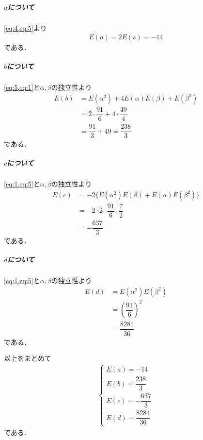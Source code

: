 \documentclass[../../main.tex]{subfiles}
\begin{document}
\subparagraph{$a$について}

\cref{eq:4,eq:5}より
\begin{align}
  E(a)=2E(s)=-14
\end{align}
である．

\subparagraph{$b$について}

\cref{eq:5,eq:1}と$\alpha,\beta$の独立性より
\begin{align}
  E(b)
  &=E(\alpha^2)+4E(\alpha)E(\beta)+E(\beta^2) \\
  &=2\cdot\dfrac{91}{6}+4\cdot\dfrac{49}{4} \\
  &=\dfrac{91}{3}+49=\dfrac{238}{3}
\end{align}
である．

\subparagraph{$c$について}

\cref{eq:1,eq:5}と$\alpha,\beta$の独立性より
\begin{align}
  E(c)
  &=-2\bigl\{E(\alpha^2)E(\beta)+E(\alpha)E(\beta^2)\bigr\} \\
  &=-2\cdot2\cdot\dfrac{91}{6}\cdot\dfrac{7}{2} \\
  &=-\dfrac{637}{3}
\end{align}
である．

\subparagraph{$d$について}

\cref{eq:1,eq:5}と$\alpha,\beta$の独立性より
\begin{align}
  E(d)
  &=E(\alpha^2)E(\beta^2) \\
  &=\left(\dfrac{91}{6}\right)^2 \\
  &=\dfrac{8281}{36}
\end{align}
である．
\casesend

以上をまとめて
\begin{align}
  \begin{cases}
    E(a)=-14 \\
    E(b)=\dfrac{238}{3} \\
    E(c)=-\dfrac{637}{3} \\
    E(d)=\dfrac{8281}{36}
  \end{cases}
\end{align}
である．

\newpage
\end{document}
